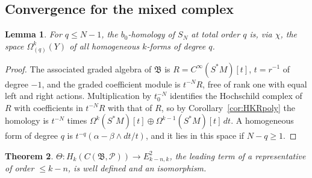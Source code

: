 \documentclass[11pt,oneside,reqno]{article}
\newcommand{\cP}{\mathcal P}
\newcommand{\CI}{C^\infty}
\newcommand{\Om}{\Omega}
\theoremstyle{plain}
\newtheorem{theorem}{Theorem}[section]
\newtheorem{lemma}[theorem]{Lemma}
\theoremstyle{definition}
\theoremstyle{remark}
\begin{document}
\subsection{Convergence for the mixed complex}

\begin{lemma}\label{lem:stageE1}
For \(q\le N-1\), the \(b_0\)-homology of \(S_N\) at total order \(q\) is, via \(\chi\), the space
\(\Om^k_{(q)}(Y)\) of all homogeneous \(k\)-forms of degree \(q\).
\end{lemma}

\begin{proof}
The associated graded algebra of \(\mathfrak B\) is \(R=\CI(S^*M)[t]\), \(t=r^{-1}\) of degree \(-1\), and the
graded coefficient module is \(t^{-N}R\), free of rank one with equal left and right actions.
Multiplication by \(t_0^{-N}\) identifies the Hochschild complex of \(R\) with coefficients in
\(t^{-N}R\) with that of \(R\), so by Corollary~\ref{cor:HKRpoly} the homology is \(t^{-N}\) times
\(\Om^k(S^*M)[t]\oplus\Om^{k-1}(S^*M)[t]\,dt\). A homogeneous form of degree \(q\) is
\(t^{-q}(\alpha-\beta\wedge dt/t)\), and it lies in this space if \(N-q\ge1\).
\end{proof}

\begin{theorem}\label{thm:mixedconv}
\(\Theta:H_k(C(\mathfrak B,\cP))\to E^2_{k-n,k}\), the leading term of a representative of order
\(\le k-n\), is well defined and an isomorphism.
\end{theorem}
\end{document}
